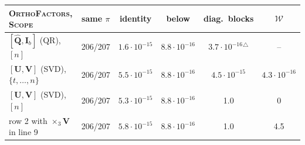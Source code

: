 \begin{tabular}{@{}l c c c c c@{}}
\toprule
\textsc{OrthoFactors}, \textsc{Scope} & same $\pi$ & identity & below & diag.\ blocks & $\boldsymbol{\mathcal W}$\\
\midrule
$[\hat{\mathbf Q},\mathbf I_b]$ (QR), $[n]$ & 206/207 & $1.6\cdot10^{-15}$ & $8.8\cdot10^{-16}$ & $3.7\cdot10^{-16}$$^{\triangle}$ & --\\
$[\mathbf U,\mathbf V]$ (SVD), $\{t,\dots,n\}$ & 206/207 & $5.5\cdot10^{-15}$ & $8.8\cdot10^{-16}$ & $4.5\cdot10^{-15}$ & $4.3\cdot10^{-16}$\\
$[\mathbf U,\mathbf V]$ (SVD), $[n]$ & 206/207 & $5.3\cdot10^{-15}$ & $8.8\cdot10^{-16}$ & 1.0 & 0\\
row 2 with $\times_3\mathbf V$ in line 9 & 206/207 & $5.8\cdot10^{-15}$ & $8.8\cdot10^{-16}$ & 1.0 & 4.5\\
\bottomrule
\end{tabular}
